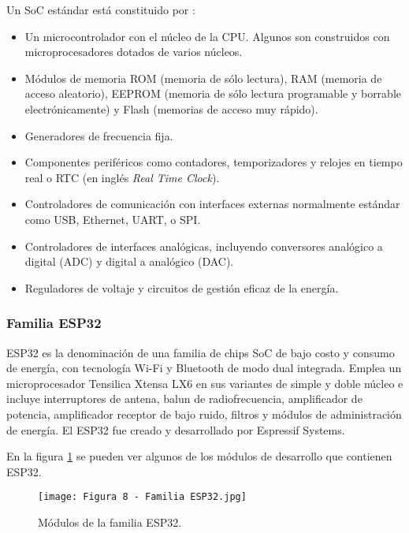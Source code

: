 Un SoC estándar está constituido por \citep{12}:

\begin{itemize}
	\item Un microcontrolador con el núcleo de la CPU. Algunos son construidos con microprocesadores dotados de varios núcleos.
	\item Módulos de memoria ROM (memoria de sólo lectura), RAM (memoria de acceso aleatorio), EEPROM (memoria de sólo lectura programable y borrable electrónicamente) y Flash (memorias de acceso muy rápido).
	\item Generadores de frecuencia fija.
	\item Componentes periféricos como contadores, temporizadores y relojes en tiempo real o RTC (en inglés \textit{Real Time Clock}).
	\item Controladores de comunicación con interfaces externas normalmente estándar como USB, Ethernet, UART, o SPI.
	\item Controladores de interfaces analógicas, incluyendo conversores analógico a digital (ADC) y digital a analógico (DAC).
	\item Reguladores de voltaje y circuitos de gestión eficaz de la energía.
\end{itemize}

\subsubsection{Familia ESP32}\citep{13}

ESP32 es la denominación de una familia de chips SoC de bajo costo y consumo de energía, con tecnología Wi-Fi y Bluetooth de modo dual integrada. Emplea un microprocesador Tensilica Xtensa LX6 en sus variantes de simple y doble núcleo e incluye interruptores de antena, balun de radiofrecuencia, amplificador de potencia, amplificador receptor de bajo ruido, filtros y módulos de administración de energía. El ESP32 fue creado y desarrollado por Espressif Systems.

En la figura \ref{fig:8} se pueden ver algunos de los módulos de desarrollo que contienen ESP32.

\begin{figure}[h]
\centering
\texttt{[image: Figura 8 - Familia ESP32.jpg]}
\caption[Familia ESP32]{Módulos de la familia ESP32. \footnotemark}
\label{fig:8}
\end{figure}

